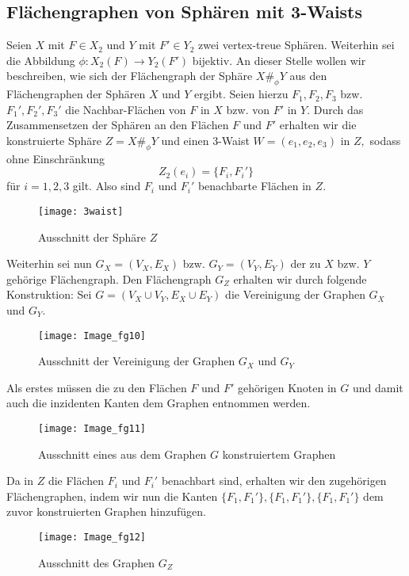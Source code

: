 \documentclass[12pt,titlepage,twoside,cleardoublepage]{article}
\theoremstyle{nummermitklammern}
\numberwithin{equation}{section}
\begin{document}
\subsection{Flächengraphen von Sphären mit 3-Waists}
Seien $X$ mit $F\in X_2$ und $Y$ mit $F'\in Y_2$ zwei vertex-treue Sphären. Weiterhin sei die Abbildung $\phi:X_2(F)\to Y_2(F')$ bijektiv. An dieser Stelle wollen wir beschreiben, wie sich der Flächengraph der Sphäre $X\#_{\phi}Y$ aus den Flächengraphen der Sphären $X$ und $Y$ ergibt. Seien hierzu $F_1,F_2,F_3$ bzw. $F_1',F_2',F_3'$ die Nachbar-Flächen von $F$ in $X$ bzw. von $F'$ in $Y.$ Durch das Zusammensetzen der Sphären an den Flächen $F$ und $F'$ erhalten wir die konstruierte Sphäre $Z=X \#_\phi Y$ und einen 3-Waist $W=(e_1,e_2,e_3)$ in $Z,$ sodass ohne Einschränkung 
\[
Z_2(e_i)=\{F_i,F_i'\}
\] für $i=1,2,3$ gilt. Also sind $F_i$ und $F_i'$ benachbarte Flächen in $Z$.
\begin{figure}[H]
\begin{center}
\texttt{[image: 3waist]}
\end{center}
\caption{Ausschnitt der Sphäre $Z$}
\end{figure}   
 Weiterhin sei nun $G_X=(V_X,E_X)$ bzw. $G_Y=(V_Y,E_Y)$ der zu $X$ bzw. $Y$ gehörige Flächengraph. Den Flächengraph $G_Z$ erhalten wir durch folgende Konstruktion:
Sei $G=(V_X\cup V_Y,E_X \cup E_Y)$ die Vereinigung der Graphen $G_X$ und $G_Y.$
\begin{figure}[H]
\begin{center}
\texttt{[image: Image\_fg10]}
\end{center}
\caption{Ausschnitt der Vereinigung der Graphen $G_X$ und $G_Y$}
\end{figure}
Als erstes müssen die zu den Flächen $F$ und $F'$ gehörigen Knoten in $G$ und damit auch die inzidenten Kanten dem Graphen entnommen werden. 
\begin{figure}[H]
\begin{center}
\texttt{[image: Image\_fg11]}
\end{center}
\caption{Ausschnitt eines aus dem Graphen $G$ konstruiertem Graphen}
\end{figure}
Da in $Z$ die Flächen $F_i$ und $F_i'$ benachbart sind, erhalten wir den zugehörigen Flächengraphen, indem wir nun die Kanten $\{F_1,F_1'\},\{F_1,F_1'\},\{F_1,F_1'\}$ dem zuvor konstruierten Graphen hinzufügen. 
\begin{figure}[H]
\begin{center}
\texttt{[image: Image\_fg12]}
\end{center}
\caption{Ausschnitt des Graphen $G_Z$}
\end{figure}
\end{document}
